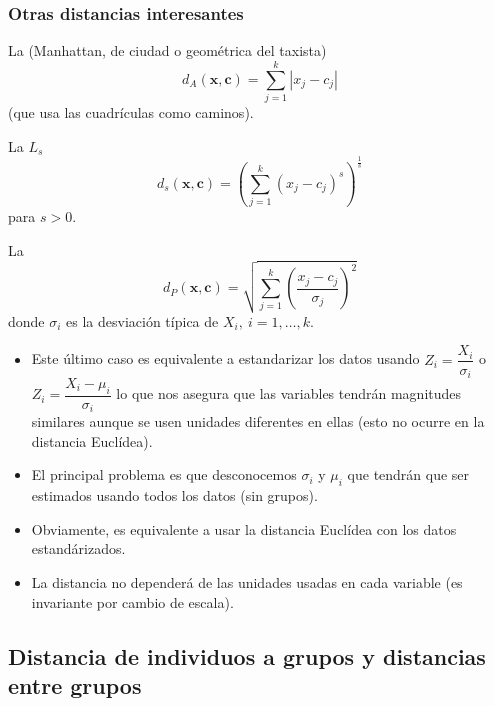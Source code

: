 \subsubsection{Otras distancias interesantes}
La  (Manhattan, de ciudad o geométrica del taxista) \[ d_A(\mathbf{x,c})=\sum_{j=1}^{k}\left|x_j-c_j\right| \](que usa las cuadrículas como caminos).

La  $L_s$ \[ d_s(\mathbf{x,c})=\left(\sum_{j=1}^{k}(x_j-c_j)^s\right) ^{\frac{1}{s}}\]para $s>0$.

La  \[ d_P(\mathbf{x,c})=\sqrt{\sum_{j=1}^{k}\left(\dfrac{x_j-c_j}{\sigma_j}\right)^2} \]donde $\sigma_i$ es la desviación típica de $X_i,\:i=1,\dots,k$.
\begin{itemize}
\item Este último caso es equivalente a estandarizar los datos usando $Z_i=\dfrac{X_i}{\sigma_i}$ o $Z_i=\dfrac{X_i-\mu_i}{\sigma_i}$ lo que nos asegura que las variables tendrán magnitudes similares aunque se usen unidades diferentes en ellas (esto no ocurre en la distancia Euclídea).
\item El principal problema es que desconocemos $\sigma_i$ y $\mu_i$ que tendrán que ser estimados usando todos los datos (sin grupos).
\item Obviamente, es equivalente a usar la distancia Euclídea con los datos estandárizados.
\item La distancia no dependerá de las unidades usadas en cada variable (es invariante por cambio de escala).
\end{itemize}
\subsection{Distancia de individuos a grupos y distancias entre grupos}
